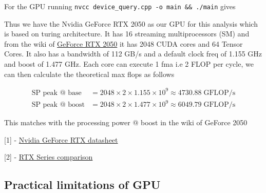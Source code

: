 For the GPU running
\texttt{nvcc\ device\_query.cpp\ -o\ main\ \&\&\ ./main} gives

\begin{Shaded}
\begin{Highlighting}[]
\end{Highlighting}
\end{Shaded}

Thus we have the Nvidia GeForce RTX 2050 as our GPU for this analysis
which is based on turing architecture. It has 16 streaming
multiprocessors (SM) and from the wiki of
\href{https://en.wikipedia.org/wiki/GeForce_RTX_20_series\#Laptop}{GeForce
RTX 2050} it has 2048 CUDA cores and 64 Tensor Cores. It also has a
bandwidth of 112 GB/s and a default clock freq of 1.155 GHz and boost of
1.477 GHz. Each core can execute 1 fma i.e 2 FLOP per cycle, we can then
calculate the theoretical max flops as follows

\[
\begin{aligned}
\text{SP peak @ base} 
&= 2048 \times 2 \times 1.155\!\times\!10^9 
\approx 4730.88\;\mathrm{GFLOP/s}\\
\text{SP peak @ boost} 
&= 2048 \times 2 \times 1.477\!\times\!10^9 
\approx 6049.79\;\mathrm{GFLOP/s}
\end{aligned}
\]

This matches with the processing power @ boost in the wiki of GeForce
2050

{[}1{]} -
\href{https://www.techpowerup.com/gpu-specs/geforce-rtx-2050-mobile.c3859}{Nvidia
GeForce RTX datasheet}

{[}2{]} -
\href{https://www.nvidia.com/fi-fi/geforce/gaming-laptops/compare-20-series/}{RTX
Series comparison}

\hypertarget{practical-limitations-of-gpu}{%
\subsection{Practical limitations of
GPU}\label{practical-limitations-of-gpu}}


